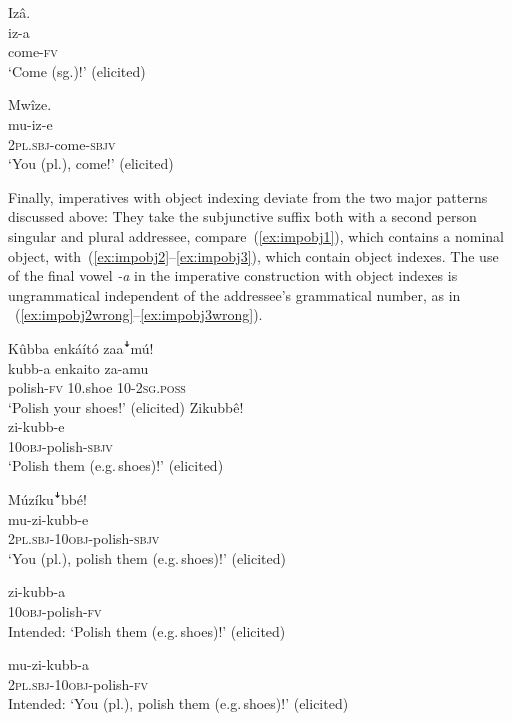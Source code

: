 \documentclass[output=paper,colorlinks,citecolor=brown,draftmode]{langscibook}
\begin{document}
\ea \label{ex:normalimp}
\begin{xlist}
	\ex \label{ex:normalimp1}
	\glll   Izâ.\\
	        iz-a\\
		    come-\textsc{fv}\\
    \glt    ‘Come (sg.)!’  (elicited)
	
	\ex \label{ex:normalimp2}
	\glll   Mwîze.\\
	        mu-iz-e\\
		    2\textsc{pl.sbj}-come-\textsc{sbjv}\\
    \glt    ‘You (pl.), come!' (elicited)
\end{xlist}
\z

Finally, imperatives with object indexing deviate from the two major patterns discussed above: 
They take the subjunctive suffix both with a second person singular and plural addressee, compare~(\ref{ex:impobj1}), which contains a nominal object, with~(\ref{ex:impobj2}--\ref{ex:impobj3}), which contain object indexes. 
The use of the final vowel \textit{-a} in the imperative construction with object indexes is ungrammatical independent of the addressee's grammatical number, as in ~(\ref{ex:impobj2wrong}--\ref{ex:impobj3wrong}).

\ea \label{ex:impobj} 
\begin{xlist}
\ex \label{ex:impobj1} 
	\glll  Kûbba enkáító zaaꜜmú!\\
	        kubb-a enkaito za-amu\\
		    polish-\textsc{fv} 10.shoe 10-2\textsc{sg.poss}\\
	\glt    ‘Polish your shoes!’  (elicited)
\ex \label{ex:impobj2}
	\glll  Zikubbê!\\
	    zi-kubb-e\\
		10\textsc{obj}-polish-\textsc{sbjv}\\
	\glt ‘Polish them (e.g.\,shoes)!’ (elicited)
	
\ex \label{ex:impobj3}
	\glll   Múzíkuꜜbbé!\\
	        mu-zi-kubb-e\\
		    2\textsc{pl.sbj}-10\textsc{obj}-polish-\textsc{sbjv}\\
	\glt ‘You (pl.), polish them (e.g.\,shoes)!’ (elicited)

\ex \label{ex:impobj2wrong}
	\gll *zi-kubb-a\\
		10\textsc{obj}-polish-\textsc{fv}\\
	\glt Intended: ‘Polish them (e.g.\,shoes)!’ (elicited)

\ex \label{ex:impobj3wrong}
	\gll *mu-zi-kubb-a\\ 
		2\textsc{pl.sbj}-10\textsc{obj}-polish-\textsc{fv}\\
	\glt Intended: ‘You (pl.), polish them (e.g.\,shoes)!’ (elicited)
\end{xlist}
\z
\end{document}
